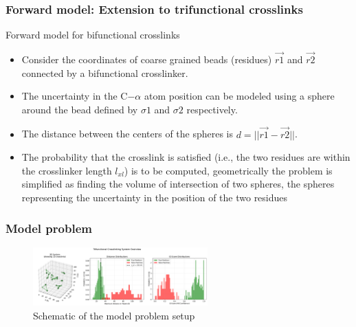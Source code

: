 \documentclass[a4paper,8pt]{beamer}
\begin{document}
\begin{frame}
    \frametitle{Forward model: Extension to trifunctional crosslinks}
    \begin{block}{}
        Forward model for bifunctional crosslinks 
        \begin{itemize}
            \item Consider the coordinates of coarse grained beads (residues) $\vec{r1}$ and $\vec{r2}$ connected by a bifunctional crosslinker.
            \item The uncertainty in the C$-\alpha$ atom position can be modeled using a sphere around the bead defined by $\sigma1$ and
            $\sigma2$ respectively.
            \item The distance between the centers of the spheres is $d = ||\vec{r1} - \vec{r2}||$.
            \item The probability that the crosslink is satisfied (i.e., the two residues are within the crosslinker length 
            $l_{xl}$) is to be computed, geometrically the problem is simplified as finding the volume of intersection of two spheres,
            the spheres representing the uncertainty in the position of the two residues        
        \end{itemize}

        \end{block}
\end{frame}
\begin{frame}
\frametitle{Model problem}
\begin{figure}
    \centering
    \includegraphics[width=0.6\textwidth]{figures/crosslinking_system.pdf}
    \caption{Schematic of the model problem setup}
\end{figure}
\end{frame}
\end{document}
